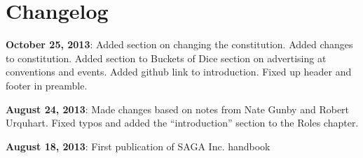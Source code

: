 \chapter*{Changelog}

\textbf{October 25, 2013}: Added section on changing the constitution. Added changes to constitution. Added section to Buckets of Dice section on advertising at conventions and events. Added github link to introduction. Fixed up header and footer in preamble.

\textbf{August 24, 2013}: Made changes based on notes from Nate Gunby and Robert Urquhart. Fixed typos and added the ``introduction'' section to the Roles chapter.

\textbf{August 18, 2013}: First publication of SAGA Inc. handbook